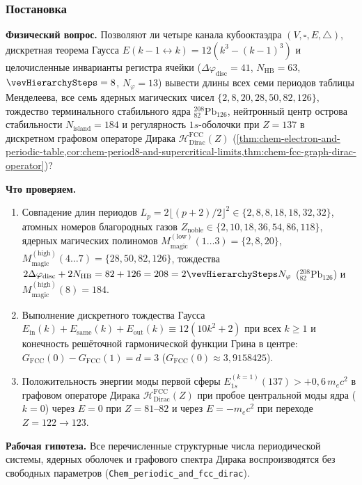 \label{exp:cech02}

\subsubsection*{Постановка}
\textbf{Физический вопрос.}
Позволяют ли четыре канала кубооктаэдра $(V,\square,E,\triangle)$, дискретная теорема Гаусса $E(k-1\leftrightarrow k) = 12(k^3-(k-1)^3)$ и целочисленные инварианты регистра ячейки ($\Delta\varphi_{\mathrm{disc}}=41$, $N_{\mathrm{HB}}=63$, $\vevHierarchySteps=8$, $N_\varphi=13$) вывести длины всех семи периодов таблицы Менделеева, все семь ядерных магических чисел $\{2,8,20,28,50,82,126\}$, тождество терминального стабильного ядра $^{208}_{82}\text{Pb}_{126}$, нейтронный центр острова стабильности $N_{\mathrm{island}}=184$ и регулярность $1s$-оболочки при $Z=137$ в дискретном графовом операторе Дирака $\mathcal{H}_{\mathrm{Dirac}}^{\mathrm{FCC}}(Z)$ (\cref{thm:chem-electron-and-periodic-table,cor:chem-period8-and-supercritical-limits,thm:chem-fcc-graph-dirac-operator})?

\textbf{Что проверяем.}
\begin{enumerate}[label=\textbf{(\alph*)},leftmargin=*,itemsep=0.25em]
\item Совпадение длин периодов $L_p = 2\lfloor(p+2)/2\rfloor^2 \in \{2,8,8,18,18,32,32\}$, атомных номеров благородных газов $Z_{\mathrm{noble}} \in \{2,10,18,36,54,86,118\}$, ядерных магических полиномов $M_{\mathrm{magic}}^{(\mathrm{low})}(1\ldots 3) = \{2,8,20\}$, $M_{\mathrm{magic}}^{(\mathrm{high})}(4\ldots 7) = \{28,50,82,126\}$, тождества $2\Delta\varphi_{\mathrm{disc}} + 2N_{\mathrm{HB}} = 82 + 126 = 208 = 2\vevHierarchySteps N_\varphi$ ($^{208}_{82}\text{Pb}_{126}$) и $M_{\mathrm{magic}}^{(\mathrm{high})}(8) = 184$.
\item Выполнение дискретного тождества Гаусса $E_{\mathrm{in}}(k) + E_{\mathrm{same}}(k) + E_{\mathrm{out}}(k) \equiv 12(10k^2+2)$ при всех $k\ge 1$ и конечность решёточной гармонической функции Грина в центре: $G_{\mathrm{FCC}}(0) - G_{\mathrm{FCC}}(1) = d = 3$ ($G_{\mathrm{FCC}}(0) \approx 3{,}9158425$).
\item Положительность энергии моды первой сферы $E_{1s}^{(k=1)}(137) > +0{,}6\,m_e c^2$ в графовом операторе Дирака $\mathcal{H}_{\mathrm{Dirac}}^{\mathrm{FCC}}(Z)$ при пробое центральной моды ядра ($k=0$) через $E=0$ при $Z=81\text{--}82$ и через $E=-m_e c^2$ при переходе $Z = 122 \to 123$.
\end{enumerate}

{\sloppy\textbf{Рабочая гипотеза.}
Все перечисленные структурные числа периодической системы, ядерных оболочек и графового спектра Дирака воспроизводятся без свободных параметров (\texttt{Chem\_periodic\_and\_fcc\_dirac}).\par}

